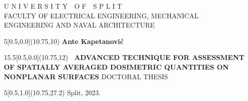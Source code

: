 \documentclass[12pt,twoside,onecolumn]{book}
\begin{document}
\frontmatter
\pagestyle{plain}

\begin{titlepage}
    \begin{center}
        {\fontsize{13}{20}\textnormal{U N I V E R S I T Y~~O F~~S P L I T}}\\
        {\fontsize{13}{20}\textnormal{FACULTY OF ELECTRICAL ENGINEERING, MECHANICAL ENGINEERING AND NAVAL ARCHITECTURE}}
        \vskip 60mm
        \begin{textblock}{5}[0.5,0.0](10.75,10) \fontsize{14}{20}\bfseries{Ante Kapetanović} \end{textblock}
        \begin{textblock}{15.5}[0.5,0.0](10.75,12)
        {\fontsize{18}{26}\bfseries\
        ADVANCED TECHNIQUE FOR ASSESSMENT OF SPATIALLY AVERAGED DOSIMETRIC QUANTITIES ON NONPLANAR SURFACES}
        \vskip 20mm
        {\fontsize{14}{20}\textnormal{DOCTORAL THESIS}}
        \end{textblock}
        \begin{textblock}{5}[0.5,1.0](10.75,27.2)
        {\fontsize{13}{20}\textnormal
        Split, 2023.}
        \end{textblock}
        \newpage
        \thispagestyle{empty}
    \end{center}
\end{titlepage}
\end{document}
